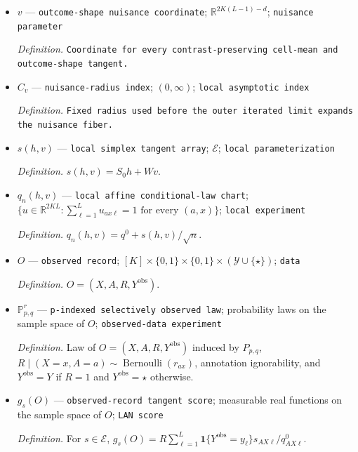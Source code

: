\documentclass{article}
\begin{document}
\begin{itemize}
  \par\smallskip\noindent\emph{Definition.} \texttt{A fixed linear bijection onto the contrast-\allowbreak{}preserving tangent kernel.}
  \item \(v\) --- \texttt{outcome-\allowbreak{}shape nuisance coordinate}; \(\mathbb R^{2K(L-1)-d}\); \texttt{nuisance parameter}
  \par\smallskip\noindent\emph{Definition.} \texttt{Coordinate for every contrast-\allowbreak{}preserving cell-\allowbreak{}mean and outcome-\allowbreak{}shape tangent.}
  \item \(C_v\) --- \texttt{nuisance-\allowbreak{}radius index}; \((0,\infty)\); \texttt{local asymptotic index}
  \par\smallskip\noindent\emph{Definition.} \texttt{Fixed radius used before the outer iterated limit expands the nuisance fiber.}
  \item \(s(h,v)\) --- \texttt{local simplex tangent array}; \(\mathcal E\); \texttt{local parameterization}
  \par\smallskip\noindent\emph{Definition.} \(s(h,v)=S_0h+Wv\).
  \item \(q_n(h,v)\) --- \texttt{local affine conditional-\allowbreak{}law chart}; \(\{u\in\mathbb R^{2KL}:\sum_{\ell=1}^{L}u_{ax\ell}=1\text{ for every }(a,x)\}\); \texttt{local experiment}
  \par\smallskip\noindent\emph{Definition.} \(q_n(h,v)=q^0+s(h,v)/\sqrt n\).
  \item \(O\) --- \texttt{observed record}; \([K]\times\{0,1\}\times\{0,1\}\times(\mathcal Y\cup\{\star\})\); \texttt{data}
  \par\smallskip\noindent\emph{Definition.} \(O=(X,A,R,Y^{\mathrm{obs}})\).
  \item \(\mathbb P^{r}_{p,q}\) --- \texttt{p-\allowbreak{}indexed selectively observed law}; probability laws on the sample space of \(O\); \texttt{observed-\allowbreak{}data experiment}
  \par\smallskip\noindent\emph{Definition.} Law of \(O=(X,A,R,Y^{\mathrm{obs}})\) induced by \(P_{p,q}\), \(R\mid(X=x,A=a)\sim\operatorname{Bernoulli}(r_{ax})\), annotation ignorability, and \(Y^{\mathrm{obs}}=Y\) if \(R=1\) and \(Y^{\mathrm{obs}}=\star\) otherwise.
  \item \(g_s(O)\) --- \texttt{observed-\allowbreak{}record tangent score}; measurable real functions on the sample space of \(O\); \texttt{LAN score}
  \par\smallskip\noindent\emph{Definition.} For \(s\in\mathcal E\), \(g_s(O)=R\sum_{\ell=1}^{L}\mathbf 1\{Y^{\mathrm{obs}}=y_\ell\}s_{AX\ell}/q^0_{AX\ell}\).

\end{itemize}
\end{document}
